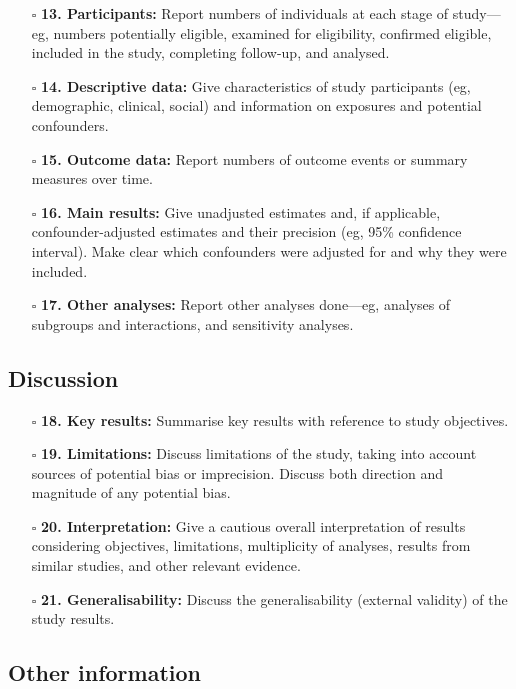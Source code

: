 \documentclass[11pt]{article}
\def\tightlist{}
\begin{document}
\begin{Form}
\begin{itemize}
\tightlist
\item[$\square$]
  \textbf{13. Participants:} Report numbers of individuals at each stage
  of study---eg, numbers potentially eligible, examined for eligibility,
  confirmed eligible, included in the study, completing follow-up, and
  analysed.
\item[$\square$]
  \textbf{14. Descriptive data:} Give characteristics of study
  participants (eg, demographic, clinical, social) and information on
  exposures and potential confounders.
\item[$\square$]
  \textbf{15. Outcome data:} Report numbers of outcome events or summary
  measures over time.
\item[$\square$]
  \textbf{16. Main results:} Give unadjusted estimates and, if
  applicable, confounder-adjusted estimates and their precision (eg,
  95\% confidence interval). Make clear which confounders were adjusted
  for and why they were included.
\item[$\square$]
  \textbf{17. Other analyses:} Report other analyses done---eg, analyses
  of subgroups and interactions, and sensitivity analyses.
\end{itemize}

\subsection{Discussion}\label{discussion}

\begin{itemize}
\tightlist
\item[$\square$]
  \textbf{18. Key results:} Summarise key results with reference to
  study objectives.
\item[$\square$]
  \textbf{19. Limitations:} Discuss limitations of the study, taking
  into account sources of potential bias or imprecision. Discuss both
  direction and magnitude of any potential bias.
\item[$\square$]
  \textbf{20. Interpretation:} Give a cautious overall interpretation of
  results considering objectives, limitations, multiplicity of analyses,
  results from similar studies, and other relevant evidence.
\item[$\square$]
  \textbf{21. Generalisability:} Discuss the generalisability (external
  validity) of the study results.
\end{itemize}

\subsection{Other information}\label{other-information}


\end{Form}
\end{document}
